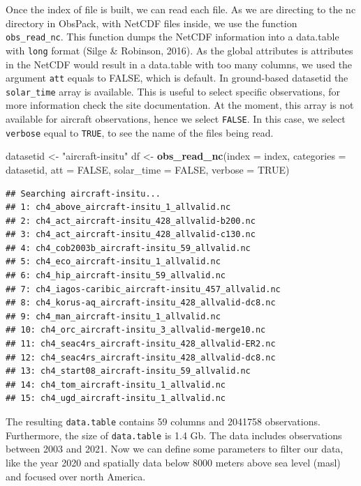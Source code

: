\documentclass[10pt,a4paper,onecolumn]{article}
\newenvironment{Shaded}{\begin{snugshade}}{\end{snugshade}}
\newcommand{\AttributeTok}[1]{\textcolor[rgb]{0.13,0.29,0.53}{#1}}
\newcommand{\ConstantTok}[1]{\textcolor[rgb]{0.56,0.35,0.01}{#1}}
\newcommand{\FunctionTok}[1]{\textcolor[rgb]{0.13,0.29,0.53}{\textbf{#1}}}
\newcommand{\NormalTok}[1]{#1}
\newcommand{\OtherTok}[1]{\textcolor[rgb]{0.56,0.35,0.01}{#1}}
\newcommand{\StringTok}[1]{\textcolor[rgb]{0.31,0.60,0.02}{#1}}
\begin{document}
Once the index of file is built, we can read each file. As we are
directing to the nc directory in ObsPack, with NetCDF files inside, we
use the function \texttt{obs\_read\_nc}. This function dumps the NetCDF
information into a data.table with \texttt{long} format (Silge \&
Robinson, 2016). As the global attributes is attributes in the NetCDF
would result in a data.table with too many columns, we used the argument
\texttt{att} equals to FALSE, which is default. In ground-based
datasetid the \texttt{solar\_time} array is available. This is useful to
select specific observations, for more information check the site
documentation. At the moment, this array is not available for aircraft
observations, hence we select \texttt{FALSE}. In this case, we select
\texttt{verbose} equal to \texttt{TRUE}, to see the name of the files
being read.

\begin{Shaded}
\begin{Highlighting}[]
\NormalTok{datasetid }\OtherTok{\textless{}{-}} \StringTok{"aircraft{-}insitu"}
\NormalTok{df }\OtherTok{\textless{}{-}} \FunctionTok{obs\_read\_nc}\NormalTok{(}\AttributeTok{index =}\NormalTok{ index,}
                  \AttributeTok{categories =}\NormalTok{ datasetid,}
                  \AttributeTok{att =} \ConstantTok{FALSE}\NormalTok{,}
                  \AttributeTok{solar\_time =} \ConstantTok{FALSE}\NormalTok{,}
                  \AttributeTok{verbose =} \ConstantTok{TRUE}\NormalTok{)}
\end{Highlighting}
\end{Shaded}

\begin{verbatim}
## Searching aircraft-insitu...
## 1: ch4_above_aircraft-insitu_1_allvalid.nc
## 2: ch4_act_aircraft-insitu_428_allvalid-b200.nc
## 3: ch4_act_aircraft-insitu_428_allvalid-c130.nc
## 4: ch4_cob2003b_aircraft-insitu_59_allvalid.nc
## 5: ch4_eco_aircraft-insitu_1_allvalid.nc
## 6: ch4_hip_aircraft-insitu_59_allvalid.nc
## 7: ch4_iagos-caribic_aircraft-insitu_457_allvalid.nc
## 8: ch4_korus-aq_aircraft-insitu_428_allvalid-dc8.nc
## 9: ch4_man_aircraft-insitu_1_allvalid.nc
## 10: ch4_orc_aircraft-insitu_3_allvalid-merge10.nc
## 11: ch4_seac4rs_aircraft-insitu_428_allvalid-ER2.nc
## 12: ch4_seac4rs_aircraft-insitu_428_allvalid-dc8.nc
## 13: ch4_start08_aircraft-insitu_59_allvalid.nc
## 14: ch4_tom_aircraft-insitu_1_allvalid.nc
## 15: ch4_ugd_aircraft-insitu_1_allvalid.nc
\end{verbatim}

The resulting \texttt{data.table} contains 59 columns and 2041758
observations. Furthermore, the size of \texttt{data.table} is 1.4 Gb.
The data includes observations between 2003 and 2021. Now we can define
some parameters to filter our data, like the year 2020 and spatially
data below 8000 meters above sea level (masl) and focused over north
America.
\end{document}
